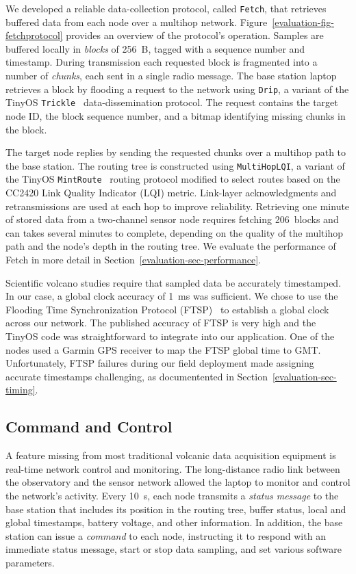 We developed a reliable data-collection protocol, called \texttt{Fetch}, that
retrieves buffered data from each node over a multihop network.
Figure~\ref{evaluation-fig-fetchprotocol} provides an overview of the
protocol's operation. Samples are buffered locally in \textit{blocks} of
256~B, tagged with a sequence number and timestamp. During transmission each
requested block is fragmented into a number of \textit{chunks}, each sent in
a single radio message. The base station laptop retrieves a block by flooding
a request to the network using \texttt{Drip}, a variant of the TinyOS
\texttt{Trickle}~\cite{trickle} data-dissemination protocol. The request
contains the target node ID, the block sequence number, and a bitmap
identifying missing chunks in the block.

The target node replies by sending the requested chunks over a multihop path
to the base station. The routing tree is constructed using
\texttt{MultiHopLQI}, a variant of the TinyOS
\texttt{MintRoute}~\cite{awoo-multihop} routing protocol modified to select
routes based on the CC2420 Link Quality Indicator (LQI) metric. Link-layer
acknowledgments and retransmissions are used at each hop to improve
reliability. Retrieving one minute of stored data from a two-channel sensor
node requires fetching 206~blocks and can takes several minutes to complete,
depending on the quality of the multihop path and the node's depth in the
routing tree. We evaluate the performance of Fetch in more detail in
Section~\ref{evaluation-sec-performance}.

Scientific volcano studies require that sampled data be accurately
timestamped. In our case, a global clock accuracy of 1~ms was sufficient. We
chose to use the Flooding Time Synchronization Protocol (FTSP)~\cite{ftsp} to
establish a global clock across our network. The published accuracy of FTSP
is very high and the TinyOS code was straightforward to integrate into our
application. One of the nodes used a Garmin GPS receiver to map the FTSP
global time to GMT. Unfortunately, FTSP failures during our field deployment
made assigning accurate timestamps challenging, as documentented in
Section~\ref{evaluation-sec-timing}.

\subsection{Command and Control}

A feature missing from most traditional volcanic data acquisition equipment
is real-time network control and monitoring. The long-distance radio link
between the observatory and the sensor network allowed the laptop to monitor
and control the network's activity. Every 10~s, each node transmits a
\textit{status message} to the base station that includes its position in the
routing tree, buffer status, local and global timestamps, battery voltage,
and other information. In addition, the base station can issue a
\textit{command} to each node, instructing it to respond with an immediate
status message, start or stop data sampling, and set various software
parameters.

